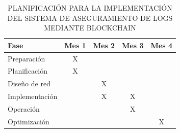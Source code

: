 \begin{table}[H]
\centering
\captionsetup{list=no}
\caption{PLANIFICACIÓN PARA LA IMPLEMENTACIÓN DEL SISTEMA DE ASEGURAMIENTO DE LOGS MEDIANTE BLOCKCHAIN}
\label{tabla:planificacion}
\begin{tabular}{|l|c|c|c|c|}
\hline
\textbf{Fase}            & \textbf{Mes 1} & \textbf{Mes 2} & \textbf{Mes 3} & \textbf{Mes 4} \\
\hline
Preparación              & X              &                &                &                \\
\hline
Planificación            & X              &                &                &                \\
\hline
Diseño de red            &                & X              &                &                \\
\hline
Implementación           &                & X              & X              &                \\
\hline
Operación                &                &                & X              &                \\
\hline
Optimización             &                &                &                & X              \\
\hline
\end{tabular}
\end{table}

